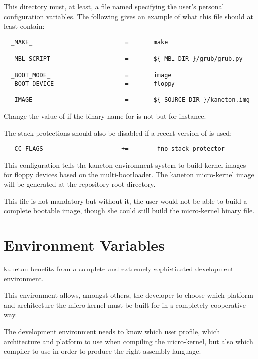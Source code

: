 This directory must, at least, a file named  specifying
the user's personal configuration variables. The following gives an example of
what this file should at least contain:

\begin{verbatim}
  _MAKE_                          =       make

  _MBL_SCRIPT_                    =       ${_MBL_DIR_}/grub/grub.py

  _BOOT_MODE_                     =       image
  _BOOT_DEVICE_                   =       floppy

  _IMAGE_                         =       ${_SOURCE_DIR_}/kaneton.img
\end{verbatim}

Change the value of  if the binary name for 
is not  but  for instance.

The stack protections should also be disabled if a recent version of 
is used:

\begin{verbatim}
  _CC_FLAGS_                     +=       -fno-stack-protector
\end{verbatim}

This configuration tells the kaneton environment system to build kernel images
for floppy devices based on the  multi-bootloader. The kaneton
micro-kernel image will be generated at the repository root directory.

This file is not mandatory but without it, the user would not be able to
build a complete bootable image, though she could still build the micro-kernel
binary file.

%
%

\section{Environment Variables}

kaneton benefits from a complete and extremely sophisticated development
environment.

This environment allows, amongst others, the developer to choose which
platform and architecture the micro-kernel must be built for in a completely
cooperative way.

The development environment needs to know which user profile, which
architecture and platform to use when compiling the micro-kernel, but also
which compiler to use in order to produce the right assembly language.

